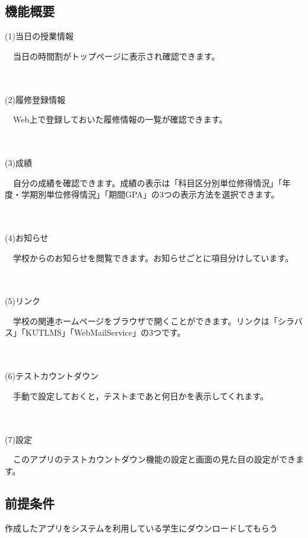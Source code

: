 \subsection{機能概要}

(1)当日の授業情報\\
\hspace{5mm}
\begin{minipage}[h]{145mm}
　当日の時間割がトップページに表示され確認できます。
\end{minipage}
\\ \\
(2)履修登録情報\\
\hspace{5mm}
\begin{minipage}[h]{145mm}
　Web上で登録しておいた履修情報の一覧が確認できます。
\end{minipage}
\\ \\
(3)成績\\
\hspace{5mm}
\begin{minipage}[h]{145mm}
　自分の成績を確認できます。成績の表示は「科目区分別単位修得情況」「年度・学期別単位修得情況」「期間GPA」の3つの表示方法を選択できます。
\end{minipage}
\\ \\
(4)お知らせ\\
\hspace{5mm}
\begin{minipage}[h]{145mm}
　学校からのお知らせを閲覧できます。お知らせごとに項目分けしています。
\end{minipage}
\\ \\
(5)リンク\\
\hspace{5mm}
\begin{minipage}[h]{145mm}
　学校の関連ホームページをブラウザで開くことができます。リンクは「シラバス」「KUTLMS」「WebMailService」の3つです。
\end{minipage}
\\ \\
(6)テストカウントダウン\\
\hspace{5mm}
\begin{minipage}[h]{145mm}
　手動で設定しておくと，テストまであと何日かを表示してくれます。
\end{minipage}
\\ \\
(7)設定\\
\hspace{5mm}
\begin{minipage}[h]{145mm}
 　このアプリのテストカウントダウン機能の設定と画面の見た目の設定ができます。
\end{minipage}

\subsection{前提条件}
 作成したアプリをシステムを利用している学生にダウンロードしてもらう
